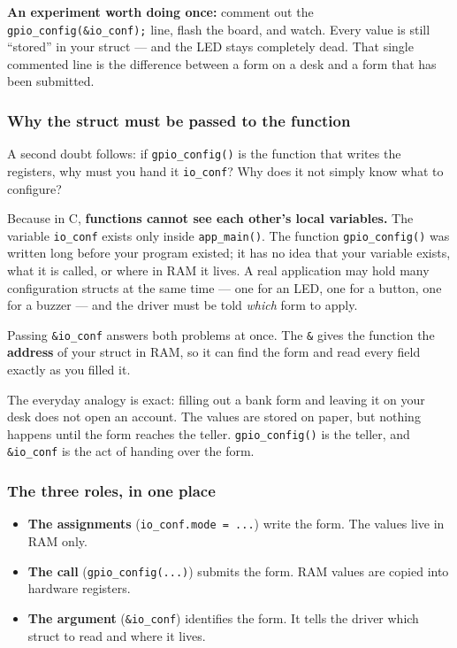\documentclass[11pt]{article}
\begin{document}
\textbf{An experiment worth doing once:} comment out the \texttt{gpio\_config(\&io\_conf);} line, flash the board, and watch. Every value is still ``stored'' in your struct --- and the LED stays completely dead. That single commented line is the difference between a form on a desk and a form that has been submitted.

\subsubsection*{Why the struct must be passed to the function}

A second doubt follows: if \texttt{gpio\_config()} is the function that writes the registers, why must you hand it \texttt{io\_conf}? Why does it not simply know what to configure?

Because in C, \textbf{functions cannot see each other's local variables.} The variable \texttt{io\_conf} exists only inside \texttt{app\_main()}. The function \texttt{gpio\_config()} was written long before your program existed; it has no idea that your variable exists, what it is called, or where in RAM it lives. A real application may hold many configuration structs at the same time --- one for an LED, one for a button, one for a buzzer --- and the driver must be told \emph{which} form to apply.

Passing \texttt{\&io\_conf} answers both problems at once. The \texttt{\&} gives the function the \textbf{address} of your struct in RAM, so it can find the form and read every field exactly as you filled it.

The everyday analogy is exact: filling out a bank form and leaving it on your desk does not open an account. The values are stored on paper, but nothing happens until the form reaches the teller. \texttt{gpio\_config()} is the teller, and \texttt{\&io\_conf} is the act of handing over the form.

\subsubsection*{The three roles, in one place}

\begin{itemize}
    \item \textbf{The assignments} (\texttt{io\_conf.mode = ...}) write the form. The values live in RAM only.
    \item \textbf{The call} (\texttt{gpio\_config(...)}) submits the form. RAM values are copied into hardware registers.
    \item \textbf{The argument} (\texttt{\&io\_conf}) identifies the form. It tells the driver which struct to read and where it lives.
\end{itemize}
\end{document}
